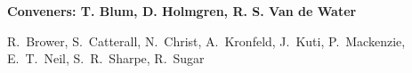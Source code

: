 

\begin{center}

\begin{large} {\bf Conveners: T. Blum, D. Holmgren, R. S. Van de Water} \end{large}

R.~Brower,
S.~Catterall,
N.~Christ,
A.~Kronfeld,
J.~Kuti,
P.~Mackenzie,
E.~T.~Neil,
S.~R.~Sharpe,
R.~Sugar

\end{center}

